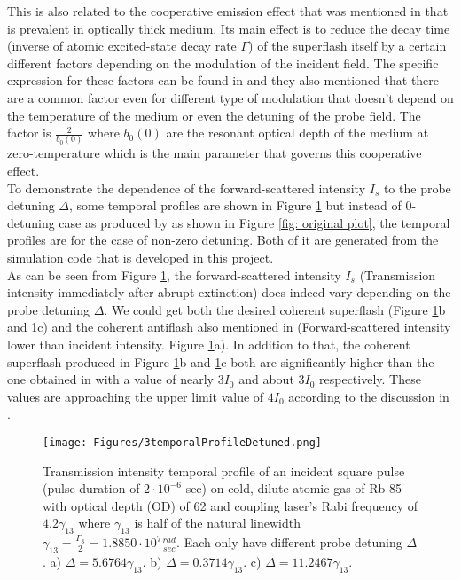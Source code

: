 This is also related to the cooperative emission effect that was mentioned in \cite{Kwong2014, Kwong2015, Kwong2017, Araujo2016} that is prevalent in optically thick medium. Its main effect is to reduce the decay time (inverse of atomic excited-state decay rate $\Gamma$) of the superflash itself by a certain different factors depending on the modulation of the incident field. The specific expression for these factors can be found in \cite{Kwong2017} and they also mentioned that there are a common factor even for different type of modulation that doesn't depend on the temperature of the medium or even the detuning of the probe field. The factor is $\frac{2}{b_{0}(0)}$ where $b_{0}(0)$ are the resonant optical depth of the medium at zero-temperature which is the main parameter that governs this cooperative effect.\\

To demonstrate the dependence of the forward-scattered intensity $I_{s}$ to the probe detuning $\Delta$, some temporal profiles are shown in Figure \ref{fig: comparing temporal profile} but instead of 0-detuning case as produced by \cite{jeong2010slow} as shown in Figure \ref{fig: original plot}, the temporal profiles are for the case of non-zero detuning. Both of it are generated from the simulation code that is developed in this project.\\

As can be seen from Figure \ref{fig: comparing temporal profile}, the forward-scattered intensity $I_{s}$ (Transmission intensity immediately after abrupt extinction) does indeed vary depending on the probe detuning $\Delta$. We could get both the desired coherent superflash (Figure \ref{fig: comparing temporal profile}b and \ref{fig: comparing temporal profile}c) and the coherent antiflash also mentioned in \cite{Kwong2017} (Forward-scattered intensity lower than incident intensity. Figure \ref{fig: comparing temporal profile}a). In addition to that, the coherent superflash produced in Figure \ref{fig: comparing temporal profile}b and \ref{fig: comparing temporal profile}c both are significantly higher than the one obtained in \cite{jeong2010slow} with a value of nearly $3I_{0}$ and about $3I_{0}$ respectively. These values are approaching the upper limit value of $4I_{0}$ according to the discussion in \cite{Kwong2014}.

\begin{figure}[h!]
    \centering
    \texttt{[image: Figures/3temporalProfileDetuned.png]}
    \caption{Transmission intensity temporal profile of an incident square pulse (pulse duration of $2\cdot10^{-6}$ sec) on cold, dilute atomic gas of Rb-85 with optical depth (OD) of 62 and coupling laser's Rabi frequency of $4.2\gamma_{13}$ where $\gamma_{13}$ is half of the natural linewidth $\gamma_{13} = \frac{\Gamma_{3}}{2} = 1.8850 \cdot 10^{7} \frac{rad}{sec}$. Each only have different probe detuning $\Delta$. a) $\Delta = 5.6764\gamma_{13}$. b) $\Delta = 0.3714\gamma_{13}$. c) $\Delta = 11.2467\gamma_{13}$.}
    \label{fig: comparing temporal profile}
\end{figure}

